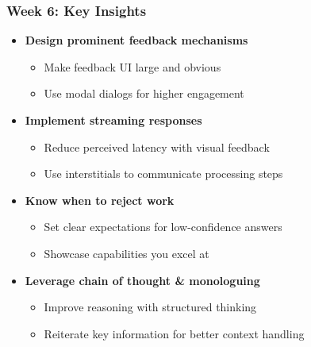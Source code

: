 \begin{frame}
    \frametitle{Week 6: Key Insights}
    
    \begin{center}
    \end{center}
    
    \begin{itemize}
        \item \textbf{Design prominent feedback mechanisms}
        \begin{itemize}
            \item Make feedback UI large and obvious
            \item Use modal dialogs for higher engagement
        \end{itemize}
        \item \textbf{Implement streaming responses}
        \begin{itemize}
            \item Reduce perceived latency with visual feedback
            \item Use interstitials to communicate processing steps
        \end{itemize}
        \item \textbf{Know when to reject work}
        \begin{itemize}
            \item Set clear expectations for low-confidence answers
            \item Showcase capabilities you excel at
        \end{itemize}
        \item \textbf{Leverage chain of thought \& monologuing}
        \begin{itemize}
            \item Improve reasoning with structured thinking
            \item Reiterate key information for better context handling
        \end{itemize}
    \end{itemize}
    
    \begin{center}
    \end{center}
\end{frame} 